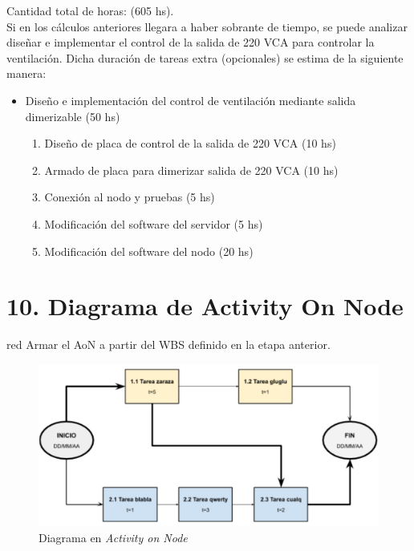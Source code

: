 \documentclass[
11pt, %
]{charter}
\begin{document}
Cantidad total de horas: (605 hs). \\
Si en los cálculos anteriores llegara a haber sobrante de tiempo, se puede analizar diseñar e implementar el control de la salida de 220 VCA para controlar la ventilación. Dicha duración de tareas extra (opcionales) se estima de la siguiente manera:
\begin{itemize}

\item Diseño e implementación del control de ventilación mediante salida dimerizable (50 hs)
	\begin{enumerate}
		\item Diseño de placa de control de la salida de 220 VCA (10 hs)
		\item Armado de placa para dimerizar salida de 220 VCA (10 hs)
		\item Conexión al nodo y pruebas (5 hs)
		\item Modificación del software del servidor (5 hs)
		\item Modificación del software del nodo (20 hs)
	\end{enumerate}
\end{itemize}

\section{10. Diagrama de Activity On Node}
\label{sec:AoN}

\begin{consigna}{red}
Armar el AoN a partir del WBS definido en la etapa anterior. 



\end{consigna}

\begin{figure}[htpb]
\centering 
\includegraphics[width=.8\textwidth]{./Figuras/AoN.png}
\caption{Diagrama en \textit{Activity on Node}}
\label{fig:AoN}
\end{figure}
\end{document}
